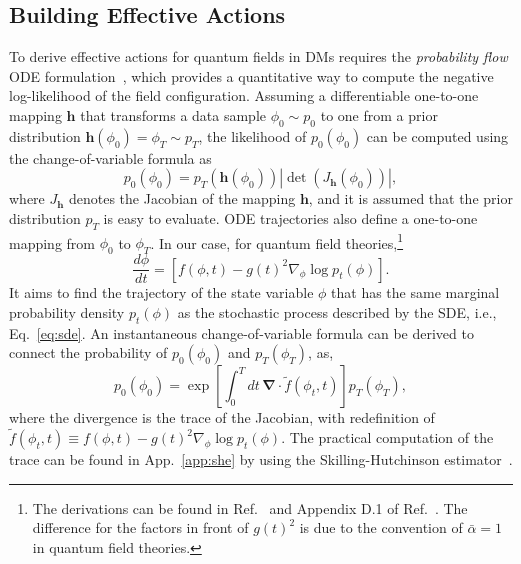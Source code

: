 \subsection{{Building Effective Actions}}
\label{subsec:continious}

{To derive effective actions for quantum fields in DMs requires the \textit{probability flow} ODE formulation~\cite{Maoutsa:2020ode,song2021scorebased}, which provides a quantitative way to compute the negative log-likelihood of the field configuration.} Assuming a differentiable one-to-one mapping $\mathbf{h}$ that transforms a data sample $\phi_0 \sim p_0$ to one from a prior distribution $\mathbf{h}(\phi_0) = \phi_T \sim p_T$, the likelihood of $p_0(\phi_0)$ can be computed using the change-of-variable formula as
\begin{equation}
p_0(\phi_0) = p_T(\mathbf{h}(\phi_0)) |\operatorname{det}(J_\mathbf{h}(\phi_0))|,\label{eq:mapping}
\end{equation}
where $J_\mathbf{h}$ denotes the Jacobian of the mapping $\mathbf{h}$, and it is assumed that the prior distribution $p_T$ is easy to evaluate. ODE trajectories also define a one-to-one mapping from $\phi_0$ to $\phi_T$. In our case, {for quantum field theories,\footnote{The derivations can be found in Ref.~\cite{risken1996fokker} and Appendix D.1 of Ref.~\cite{song2021scorebased}. The difference for the factors in front of $g(t)^2$ is due to the convention of $\bar{\alpha}= 1$ in quantum field theories.} }
\begin{equation}
\frac{d\phi}{dt} = \left[f(\phi, t) - g(t)^2 \nabla_\phi \log p_t(\phi)\right].
\label{eq:ode}
\end{equation}
It aims to find the trajectory of the state variable $\phi$ that has the same marginal probability density $p_t(\phi)$ as the stochastic process described by the SDE, i.e., Eq.~\eqref{eq:sde}. An instantaneous change-of-variable formula can be derived to connect the probability of $p_0(\phi_0)$ and $p_T(\phi_T)$, as,{
\begin{equation}
p_0 (\phi_0) = \exp\left[\int_0^T dt\,\mathbf{\nabla}\cdot \tilde{f}(\phi_t, t) \right] p_T(\phi_T),\label{eq:jacobian}
\end{equation}
where the divergence is the trace of the Jacobian, with redefinition of $\tilde{f}(\phi_t, t)\equiv f(\phi, t) - g(t)^2 \nabla_\phi \log p_t(\phi)$}. The practical computation of the trace can be found in App.~\ref{app:she} by using the Skilling-Hutchinson estimator~\cite{grathwohl2018scalable}. 

